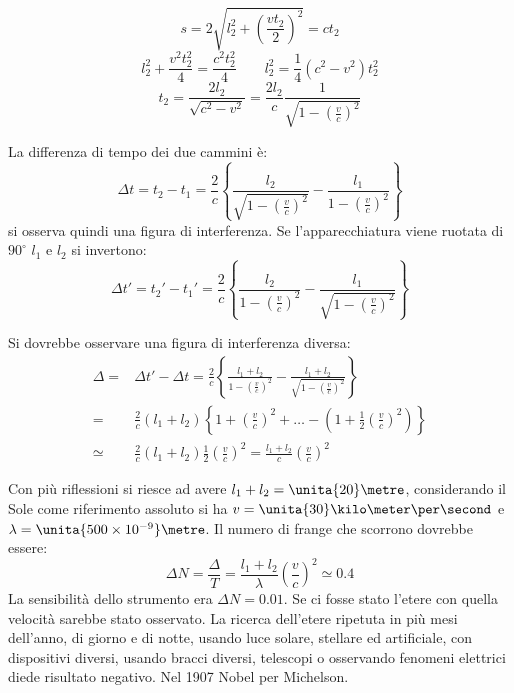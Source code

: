 \parbox[]{\textwidth}{
\begin{equation*}s=2\sqrt{l_2^2+\left(\frac{vt_2}{2}\right)^2}=ct_2\end{equation*}
\begin{equation*}l_2^2+\frac{v^2t_2^2}{4}=\frac{c^2t_2^2}{4}\qquad l_2^2=\frac{1}{4}\left(c^2-v^2\right)t_2^2\end{equation*}
\begin{equation*}t_2=\frac{2l_2}{\sqrt{c^2-v^2}}=\frac{2l_2}{c}\frac{1}{\sqrt{1-\left(\frac{v}{c}\right)^2}}\end{equation*}
}
La differenza di tempo dei due cammini è:
\begin{equation*}\Delta t=t_2-t_1=\frac{2}{c}\left\{\frac{l_2}{\sqrt{1-\left(\frac{v}{c}\right)^2}}-\frac{l_1}{1-\left(\frac{v}{c}\right)^2}\right\}\end{equation*}
si osserva quindi una figura di interferenza. Se l'apparecchiatura viene ruotata di $90^\circ$ $l_1$ e $l_2$ si invertono:
\begin{equation*}\Delta t'={t_2}'-{t_1}'=\frac{2}{c}\left\{\frac{l_2}{{1-\left(\frac{v}{c}\right)^2}}-\frac{l_1}{\sqrt{1-\left(\frac{v}{c}\right)^2}}\right\}\end{equation*}

\parbox[]{\textwidth}{
Si dovrebbe osservare una figura di interferenza diversa:
\begin{align*}
\Delta=&\Delta t'-\Delta t=\frac{2}{c}\left\{\frac{l_1+l_2}{{1-\left(\frac{v}{c}\right)^2}}-\frac{l_1+l_2}{\sqrt{1-\left(\frac{v}{c}\right)^2}}\right\}\\
=&\frac{2}{c}(l_1+l_2)\left\{1+\left(\frac{v}{c}\right)^2+\ldots-\left(1+\frac{1}{2}\left(\frac{v}{c}\right)^2\right)\right\}\\
\simeq&\frac{2}{c}(l_1+l_2)\frac{1}{2}\left(\frac{v}{c}\right)^2=\frac{l_1+l_2}{c}\left(\frac{v}{c}\right)^2\end{align*}
}
Con più riflessioni si riesce ad avere $l_1+l_2=\unita{20}\metre$, considerando il Sole come riferimento assoluto si ha $v=\unita{30}\kilo\meter\per\second$ e $\lambda=\unita{500\times 10^{-9}}\metre$.
Il numero di frange che scorrono dovrebbe essere:
\begin{equation*}\Delta N=\frac{\Delta}{T}=\frac{l_1+l_2}{\lambda}\left(\frac{v}{c}\right)^2\simeq 0.4\end{equation*}
La sensibilità dello strumento era $\Delta N=0.01$. Se ci fosse stato l'etere con quella velocità sarebbe stato osservato. La ricerca dell'etere ripetuta in più mesi dell'anno, di giorno e di notte, usando luce solare, stellare ed artificiale, con dispositivi diversi, usando bracci diversi, telescopi o osservando fenomeni elettrici diede risultato negativo. Nel 1907 Nobel per Michelson.

